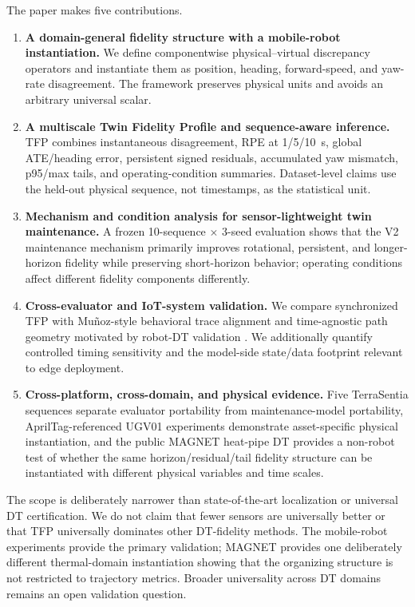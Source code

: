 \documentclass[journal]{IEEEtran}
\begin{document}
The paper makes five contributions.
\begin{enumerate}
    \item \textbf{A domain-general fidelity structure with a mobile-robot instantiation.} We define componentwise physical--virtual discrepancy operators and instantiate them as position, heading, forward-speed, and yaw-rate disagreement. The framework preserves physical units and avoids an arbitrary universal scalar.
    \item \textbf{A multiscale Twin Fidelity Profile and sequence-aware inference.} TFP combines instantaneous disagreement, RPE at 1/5/10~s, global ATE/heading error, persistent signed residuals, accumulated yaw mismatch, p95/max tails, and operating-condition summaries. Dataset-level claims use the held-out physical sequence, not timestamps, as the statistical unit.
    \item \textbf{Mechanism and condition analysis for sensor-lightweight twin maintenance.} A frozen 10-sequence $\times$ 3-seed evaluation shows that the V2 maintenance mechanism primarily improves rotational, persistent, and longer-horizon fidelity while preserving short-horizon behavior; operating conditions affect different fidelity components differently.
    \item \textbf{Cross-evaluator and IoT-system validation.} We compare synchronized TFP with Mu\~noz-style behavioral trace alignment \cite{munoz2024} and time-agnostic path geometry motivated by robot-DT validation \cite{bergs2025}. We additionally quantify controlled timing sensitivity and the model-side state/data footprint relevant to edge deployment.
    \item \textbf{Cross-platform, cross-domain, and physical evidence.} Five TerraSentia sequences separate evaluator portability from maintenance-model portability, AprilTag-referenced UGV01 experiments demonstrate asset-specific physical instantiation, and the public MAGNET heat-pipe DT provides a non-robot test of whether the same horizon/residual/tail fidelity structure can be instantiated with different physical variables and time scales.
\end{enumerate}

The scope is deliberately narrower than state-of-the-art localization or universal DT certification. We do not claim that fewer sensors are universally better or that TFP universally dominates other DT-fidelity methods. The mobile-robot experiments provide the primary validation; MAGNET provides one deliberately different thermal-domain instantiation showing that the organizing structure is not restricted to trajectory metrics. Broader universality across DT domains remains an open validation question.
\end{document}
